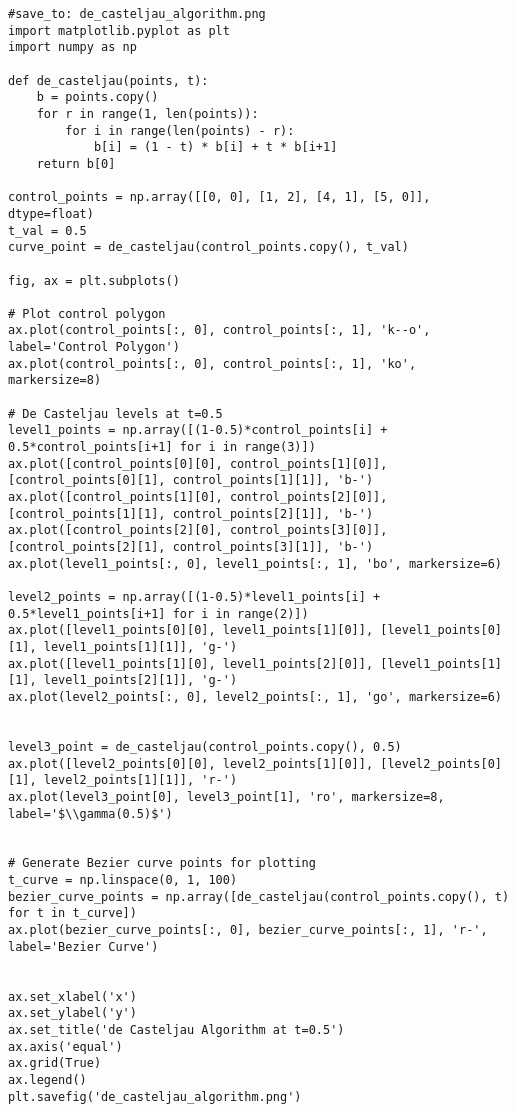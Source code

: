 \documentclass{article}
\begin{document}
\begin{verbatim}
#save_to: de_casteljau_algorithm.png
import matplotlib.pyplot as plt
import numpy as np

def de_casteljau(points, t):
    b = points.copy()
    for r in range(1, len(points)):
        for i in range(len(points) - r):
            b[i] = (1 - t) * b[i] + t * b[i+1]
    return b[0]

control_points = np.array([[0, 0], [1, 2], [4, 1], [5, 0]], dtype=float)
t_val = 0.5
curve_point = de_casteljau(control_points.copy(), t_val)

fig, ax = plt.subplots()

# Plot control polygon
ax.plot(control_points[:, 0], control_points[:, 1], 'k--o', label='Control Polygon')
ax.plot(control_points[:, 0], control_points[:, 1], 'ko', markersize=8)

# De Casteljau levels at t=0.5
level1_points = np.array([(1-0.5)*control_points[i] + 0.5*control_points[i+1] for i in range(3)])
ax.plot([control_points[0][0], control_points[1][0]], [control_points[0][1], control_points[1][1]], 'b-')
ax.plot([control_points[1][0], control_points[2][0]], [control_points[1][1], control_points[2][1]], 'b-')
ax.plot([control_points[2][0], control_points[3][0]], [control_points[2][1], control_points[3][1]], 'b-')
ax.plot(level1_points[:, 0], level1_points[:, 1], 'bo', markersize=6)

level2_points = np.array([(1-0.5)*level1_points[i] + 0.5*level1_points[i+1] for i in range(2)])
ax.plot([level1_points[0][0], level1_points[1][0]], [level1_points[0][1], level1_points[1][1]], 'g-')
ax.plot([level1_points[1][0], level1_points[2][0]], [level1_points[1][1], level1_points[2][1]], 'g-')
ax.plot(level2_points[:, 0], level2_points[:, 1], 'go', markersize=6)


level3_point = de_casteljau(control_points.copy(), 0.5)
ax.plot([level2_points[0][0], level2_points[1][0]], [level2_points[0][1], level2_points[1][1]], 'r-')
ax.plot(level3_point[0], level3_point[1], 'ro', markersize=8, label='$\\gamma(0.5)$')


# Generate Bezier curve points for plotting
t_curve = np.linspace(0, 1, 100)
bezier_curve_points = np.array([de_casteljau(control_points.copy(), t) for t in t_curve])
ax.plot(bezier_curve_points[:, 0], bezier_curve_points[:, 1], 'r-', label='Bezier Curve')


ax.set_xlabel('x')
ax.set_ylabel('y')
ax.set_title('de Casteljau Algorithm at t=0.5')
ax.axis('equal')
ax.grid(True)
ax.legend()
plt.savefig('de_casteljau_algorithm.png')
\end{verbatim}
\end{document}
